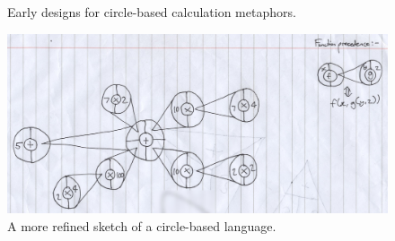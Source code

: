 \documentclass[12pt,twoside,notitlepage,xetex]{report}
\begin{document}
\begin{center}
\begin{figure}[H]
\begin{center}
\end{center}
\caption{Early designs for circle-based calculation metaphors.}
\end{figure}
\end{center}

\begin{center}
\begin{figure}
\begin{center}
\includegraphics[width=\textwidth]{figs/mockups/sketches/21/21a.jpg}
\end{center}
\caption{A more refined sketch of a circle-based language.}
\end{figure}
\end{center}
\end{document}
